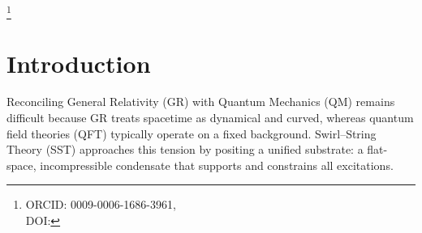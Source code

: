 \documentclass[10pt,reprint,aps,onecolumn,nofootinbib]{revtex4-2}
\begin{document}
\title{\papertitle}
\author{Omar Iskandarani}
\thanks{ORCID: 0009-0006-1686-3961, \\ DOI: \paperdoi}
\date{\today}

\begin{abstract}
We present \emph{Swirl--String Theory} (SST), a fluid–topological framework in which matter and radiation are modeled as quantized vortex loops (“swirl strings”) in an incompressible, non-dissipative condensate. Within SST, classical gravitational phenomenology \emph{emerges} as a collective pressure effect in flat space, while local swirl flows \emph{recover} relativistic time-dilation kinematics. We formulate a covariant effective field theory on a preferred foliation, show how topological quantization organizes a discrete particle spectrum, and outline a route by which gauge structures may be \emph{derived} from orientational textures of the medium. A modified Faraday law is proposed in which time-varying swirl areal density sources an electromotive impulse; this yields geometry-independent, quantized flux signatures that serve as explicit falsification targets. Wave–particle duality is described via R/T phase dynamics (unknotted vs.\ knotted states), with measurement modeled as an R$\leftrightarrow$T transition. We compare SST with Kelvin’s vortex lineage, analogue-gravity programs, and emergent-gauge constructions, emphasizing where SST \emph{recovers} established limits (Newtonian gravity, Maxwell electrodynamics, quantum interference) and where it \emph{predicts} deviations that are testable in BECs, superconducting films, and attosecond spectroscopy. All equations use SI units with dimensional checks. Our aim is a parameter-light, topological account that complements standard formulations and invites direct experimental appraisal.
\emph{Keywords:} vortex dynamics; topological fluid; emergent gauge theory; time dilation; quantum measurement; attosecond spectroscopy
\end{abstract}
\maketitle

\section{Introduction}
    \label{sec:intro}
    Reconciling General Relativity (GR) with Quantum Mechanics (QM) remains difficult because GR treats spacetime as dynamical and curved, whereas quantum field theories (QFT) typically operate on a fixed background. Swirl–String Theory (SST) approaches this tension by positing a unified substrate: a flat-space, incompressible condensate that supports and constrains all excitations.
\end{document}

